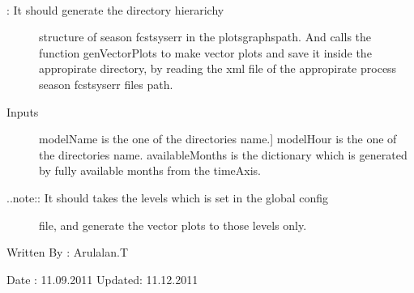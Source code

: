 \documentclass[letterpaper,10pt,english]{sphinxmanual}
\begin{document}
\begin{fulllineitems}
\label{diagnosis:generate_winds_plots.genSeasonFcstSysErrDirs}~\begin{description}
\item[{{\hyperref[diagnosis:generate_winds_plots.genSeasonFcstSysErrDirs]{}}: It should generate the directory hierarichy}] \leavevmode
structure of season fcstsyserr in the plotsgraphspath. And calls the
function genVectorPlots to make vector plots and save it inside the
appropirate directory, by reading the xml file of the appropirate
process season fcstsyserr files path.

\item[{Inputs}] \leavevmode{[}modelName is the one of the directories name.{]}
modelHour is the one of the directories name.
availableMonths is the dictionary which is generated by fully
available months from the timeAxis.

\item[{..note:: It should takes the levels which is set in the global config}] \leavevmode
file, and generate the vector plots to those levels only.

\end{description}

Written By : Arulalan.T

Date : 11.09.2011
Updated: 11.12.2011

\end{fulllineitems}

\end{document}
